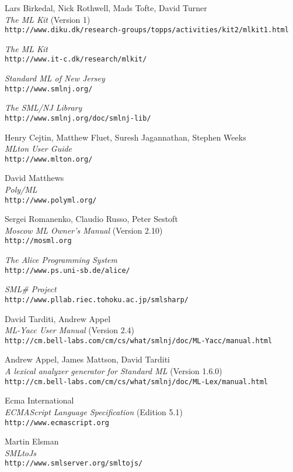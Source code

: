 \documentclass[twoside,titlepage]{article}
\begin{document}
\begin{appendix}
\begin{thebibliography}{MTHM97}
Lars Birkedal, Nick Rothwell, Mads Tofte, David Turner \\
{\it The ML Kit} (Version 1) \\
{\small\tt{http://www.diku.dk/research-groups/topps/activities/kit2/mlkit1.html}}

{\it The ML Kit} \\
{\small\tt{http://www.it-c.dk/research/mlkit/}}

{\it Standard ML of New Jersey} \\
{\small\tt{http://www.smlnj.org/}}

{\it The SML/NJ Library} \\
{\small\tt{http://www.smlnj.org/doc/smlnj-lib/}}

Henry Cejtin, Matthew Fluet, Suresh Jagannathan, Stephen Weeks \\
{\it MLton User Guide} \\
{\small\tt{http://www.mlton.org/}}

David Matthews \\
{\it Poly/ML} \\
{\small\tt{http://www.polyml.org/}}

Sergei Romanenko, Claudio Russo, Peter Sestoft \\
{\it Moscow ML Owner's Manual} (Version 2.10) \\
{\small\tt{http://mosml.org}}

{\it The Alice Programming System} \\
{\small\tt{http://www.ps.uni-sb.de/alice/}}

{\it SML\# Project} \\
{\small\tt{http://www.pllab.riec.tohoku.ac.jp/smlsharp/}}

David Tarditi, Andrew Appel \\
{\it ML-Yacc User Manual} (Version 2.4) \\
{\small\tt{http://cm.bell-labs.com/cm/cs/what/smlnj/doc/ML-Yacc/manual.html}}

Andrew Appel, James Mattson, David Tarditi \\
{\it A lexical analyzer generator for Standard ML} (Version 1.6.0) \\
{\small\tt{http://cm.bell-labs.com/cm/cs/what/smlnj/doc/ML-Lex/manual.html}}

Ecma International \\
{\it ECMAScript Language Specification} (Edition 5.1) \\
{\small\tt{http://www.ecmascript.org}}

Martin Elsman \\
{\it SMLtoJs} \\
{\small\tt{http://www.smlserver.org/smltojs/}}

\end{thebibliography}


\end{appendix}

\end{document}
